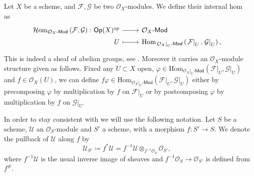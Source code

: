 \begin{defn}\label{defn:iHomOXMod}
	Let $X$ be a scheme, and $\mathcal{F}, \mathcal{G}$ be two $\mathcal{O}_{ X }$-modules.
	We define their internal hom as
	\begin{equation*}
	\begin{tikzcd}[row sep = 0ex
		,/tikz/column 1/.append style={anchor=base east}
		,/tikz/column 2/.append style={anchor=base west}]
		\mathcal{H}\mathrm{om}_{ \mathcal{O}_{ X }\text{-}\mathsf{Mod} }
		\left( \mathcal{F}, \mathcal{G} \right)\colon 
		\mathsf{Op}(X)^{op} \arrow[r, "", rightarrow] &
		\mathcal{O}_{ X }\text{-}\mathsf{Mod} \\
		U \arrow[r, "", mapsto] & 
		\mathrm{Hom}_{ \left.\mathcal{O}_{ X }\right|_{U}\text{-}\mathsf{Mod} } 
			\left( \left.\mathcal{F}\right|_{U}, \left.\mathcal{G}\right|_{U} \right)
	,\end{tikzcd}
	\end{equation*} 
	This is indeed a sheaf of abelian groups, see 
	\cite[\href{https://stacks.math.columbia.edu/tag/00AK}{Section 00AK}]{SP}.
	Moreover it carries an $\mathcal{O}_{ X }$-module structure given as follows.
	Fixed any $U \subset X$ open, 
	$\varphi \in \mathrm{Hom}_{ \left.\mathcal{O}_{ X }\right|_{U}\text{-}\mathsf{Mod}} 
	\left( \left.\mathcal{F}\right|_{U} , \left.\mathcal{G}\right|_{U} \right)$ and
	$f \in \mathcal{O}_{ X }(U)$, we can define $f \varphi \in
	\mathrm{Hom}_{ \left.\mathcal{O}_{ X }\right|_{U}\text{-}\mathsf{Mod}  } 
	\left( \left.\mathcal{F}\right|_{U} , \left.\mathcal{G}\right|_{U} \right)$
	either by precomposing $\varphi$ by multiplication
	by $f$ on $\left.\mathcal{F}\right|_{U}$ or by postcomposing $\varphi$
	by multiplication by $f$ on $\left.\mathcal{G}\right|_{U}$.
\end{defn}


\begin{ntt}[]
	In order to stay consistent with
	\cite{Messing} we will use the following notation.
	Let $S$ be a scheme, $\mathcal{U}$ an $\mathcal{O}_{ S }$-module
	and $S'$ a scheme, with a morphism
	$f\colon S' \to S$.
	We denote the pullback of $\mathcal{U}$ along $f$ by 
	\begin{equation*}
	\mathcal{U}_{S'} \coloneqq f^*\mathcal{U} = 
	f^{-1}\mathcal{U} \otimes_{f^{-1}\mathcal{O}_{ S }} \mathcal{O}_{ S' }
	,\end{equation*}
	where $f^{-1} \mathcal{U}$ is the usual inverse image of sheaves and
	$f^{-1}\mathcal{O}_{ S } \to \mathcal{O}_{ S' }$ is defined from $f^\#$.
\end{ntt}


